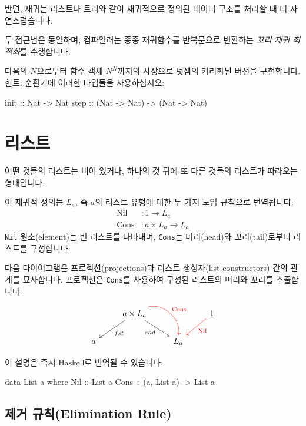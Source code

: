 \documentclass[DaoFP]{subfiles}
\begin{document}
반면, 재귀는 리스트나 트리와 같이 재귀적으로 정의된 데이터 구조를 처리할 때 더 자연스럽습니다.

두 접근법은 동일하며, 컴파일러는 종종 재귀함수를 반복문으로 변환하는 \emph{꼬리 재귀 최적화}를 수행합니다.

\begin{exercise}  
다음의 $N$으로부터 함수 객체 $N^N$까지의 사상으로 덧셈의 커리화된 버전을 구현합니다. 힌트: 순환기에 이러한 타입들을 사용하십시오:
\begin{haskell}
init :: Nat -> Nat
step :: (Nat -> Nat) -> (Nat -> Nat)
\end{haskell}

\end{exercise}

\section{리스트}

어떤 것들의 리스트는 비어 있거나, 하나의 것 뒤에 또 다른 것들의 리스트가 따라오는 형태입니다.

이 재귀적 정의는 $L_a$, 즉 $a$의 리스트 유형에 대한 두 가지 도입 규칙으로 번역됩니다:
\begin{align*}
 \text{Nil} &\colon 1 \to L_a \\
 \text{Cons} &\colon a \times L_a \to L_a 
\end{align*}
\texttt{Nil} 원소(element)는 빈 리스트를 나타내며, \texttt{Cons}는 머리(head)와 꼬리(tail)로부터 리스트를 구성합니다.

다음 다이어그램은 프로젝션(projections)과 리스트 생성자(list constructors) 간의 관계를 묘사합니다. 프로젝션은 \texttt{Cons}를 사용하여 구성된 리스트의 머리와 꼬리를 추출합니다.
\[
 \begin{tikzcd}
 & a \times L_a
 \arrow[ld, "fst"]
 \arrow[rd,  "snd"']
 \arrow[rd, bend left=60, red, "\text{Cons}"]
 && 1
 \arrow[ld, red, "\text{Nil}"]
 \\
 a
&&L_a
  \end{tikzcd}
\]

이 설명은 즉시 Haskell로 번역될 수 있습니다:
\begin{haskell}
data List a where
  Nil  :: List a
  Cons :: (a, List a) -> List a
\end{haskell}



\subsection{제거 규칙(Elimination Rule)}
\end{document}
